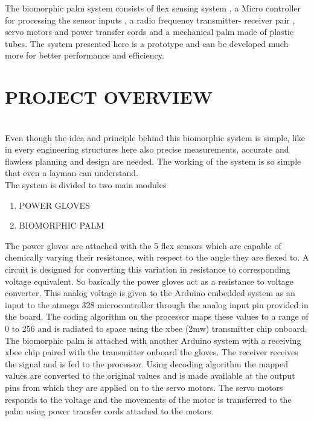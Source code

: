 \documentclass[a4paper, 12pt, notitlepage]{report}
\begin{document}
The biomorphic palm system consists of flex sensing system , a Micro controller for processing the sensor inputs , a radio frequency transmitter- receiver pair , servo motors and power transfer cords and a mechanical palm made of plastic tubes. The system presented here is a prototype and can be developed much more for better performance and efficiency. \\ 

\newpage
\chapter{PROJECT OVERVIEW}
\\
Even though the idea and principle behind this biomorphic system is simple, like in every engineering structures here also precise measurements, accurate and flawless planning and design are needed. The working of the system is so simple that even a layman can understand.\\
The system is divided to two main modules\\

\begin{enumerate}
\item POWER GLOVES
\item BIOMORPHIC PALM

\end{enumerate}

	The power gloves are attached with the 5 flex sensors which are capable of chemically varying their resistance, with respect to the angle they are flexed to. A circuit is designed for converting this variation in resistance to corresponding voltage equivalent. So basically the power gloves act as a resistance to voltage converter. This analog voltage is given to the Arduino embedded system as an input to the atmega 328 microcontroller through the analog input pin provided in the board. The coding algorithm on the processor maps these values to a range of 0 to 256 and is radiated to space using the xbee (2mw) transmitter chip onboard.\\

	The biomorphic palm is attached with another Arduino system with a receiving xbee chip paired with the transmitter onboard the gloves. The receiver receives the signal and is fed to the processor. Using decoding algorithm the mapped values are converted to the original values and is made available at the output pins from which they are applied on to the servo motors. The servo motors responds to the voltage and the movements of the motor is transferred to the palm using power transfer cords attached to the motors.\\
\end{document}
